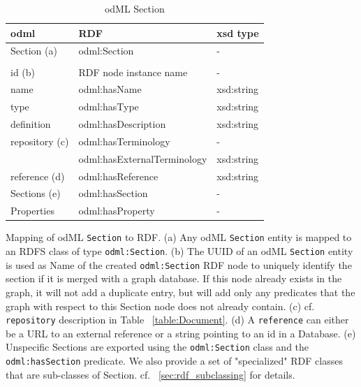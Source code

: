 \documentclass{article}
\begin{document}
\begin{table}
\begin{threeparttable}
\begin{tabular}{p{3.5cm}p{5cm}p{2cm}}
\toprule
    odml            & RDF                             & xsd type \\
\midrule
    Section (a)     & odml:Section                    & - \\
                    & & \\
    id (b)          & RDF node instance name          & - \\
    name            & odml:hasName                    & xsd:string \\
    type            & odml:hasType                    & xsd:string \\
    definition      & odml:hasDescription             & xsd:string \\
    repository (c)  & odml:hasTerminology             & - \\
                    & odml:hasExternalTerminology     & xsd:string \\
    reference (d)   & odml:hasReference               & xsd:string \\
    Sections (e)    & odml:hasSection                 & - \\
    Properties      & odml:hasProperty                & - \\
\bottomrule
\end{tabular}
\caption{odML Section}
\begin{tablenotes}
\item Mapping of odML \texttt{Section} to RDF. (a) Any odML \texttt{Section} entity is mapped to an RDFS class of type \texttt{odml:Section}. (b) The UUID of an odML \texttt{Section} entity is used as Name of the created \texttt{odml:Section} RDF node to uniquely identify the section if it is merged with a graph database. If this node already exists in the graph, it will not add a duplicate entry, but will add only any predicates that the graph with respect to this Section node does not already contain.
(c) cf. \texttt{repository} description in Table ~\ref{table:Document}. (d) A \texttt{reference} can either be a URL to an external reference or a string pointing to an id in a Database. (e) Unspecific Sections are exported using the \texttt{odml:Section} class and the \texttt{odml:hasSection} predicate. We also provide a set of "specialized" RDF classes that are sub-classes of Section. cf. ~\ref{sec:rdf_subclassing} for details.
\end{tablenotes}
\label{table:Section}
\end{threeparttable}
\end{table}
\end{document}
